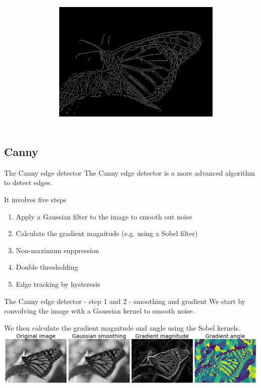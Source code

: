 \documentclass[9pt, aspectratio=169]{beamer}
\begin{document}
\begin{frame}
\begin{columns}
\begin{column}{.3\textwidth}
        \end{column}
        \pause
        \begin{column}{.4\textwidth}
            \includegraphics[width=.8\textwidth]{laplacian_of_gaussian_zero_crossing.png}
        \end{column}
    \end{columns}
\end{frame}

\subsection {Canny}
\begin{frame}
    {The Canny edge detector}
    The Canny edge detector is a more advanced algorithm to detect edges.

    It involves five steps

    \begin{enumerate}
        \item Apply a Gaussian filter to the image to smooth out noise
        \item Calculate the gradient magnitude (e.g. using a Sobel filter)
        \item Non-maximum suppression
        \item Double thresholding
        \item Edge tracking by hysteresis
    \end{enumerate}
\end{frame}

\begin{frame}
    {The Canny edge detector - step 1 and 2 - smoothing and gradient}
    We start by convolving the image with a Gaussian kernel to smooth noise.

    We then calculate the gradient magnitude and angle using the Sobel kernels.
    \centering
    \includegraphics[width=\textwidth]{canny_step1-2.png}
\end{frame}
\end{document}
